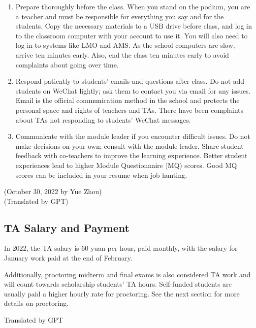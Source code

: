 \begin{enumerate}
    \item Prepare thoroughly before the class. When you stand on the podium, you are a teacher and must be responsible for everything you say and for the students. Copy the necessary materials to a USB drive before class, and log in to the classroom computer with your account to use it. You will also need to log in to systems like LMO and AMS. As the school computers are slow, arrive ten minutes early. Also, end the class ten minutes early to avoid complaints about going over time.
    \item Respond patiently to students’ emails and questions after class. Do not add students on WeChat lightly; ask them to contact you via email for any issues. Email is the official communication method in the school and protects the personal space and rights of teachers and TAs. There have been complaints about TAs not responding to students’ WeChat messages.
    \item Communicate with the module leader if you encounter difficult issues. Do not make decisions on your own; consult with the module leader. Share student feedback with co-teachers to improve the learning experience. Better student experiences lead to higher Module Questionnaire (MQ) scores. Good MQ scores can be included in your resume when job hunting.
\end{enumerate}

\begin{flushright}
    (October 30, 2022 by Yue Zhou) \\
    (Translated by GPT)
\end{flushright}

\subsection{TA Salary and Payment}
In 2022, the TA salary is 60 yuan per hour, paid monthly, with the salary for January work paid at the end of February.

\emptyline{}
Additionally, proctoring midterm and final exams is also considered TA work and will count towards scholarship students’ TA hours. Self-funded students are usually paid a higher hourly rate for proctoring. See the next section for more details on proctoring.

\begin{flushright}
    Translated by GPT
\end{flushright}